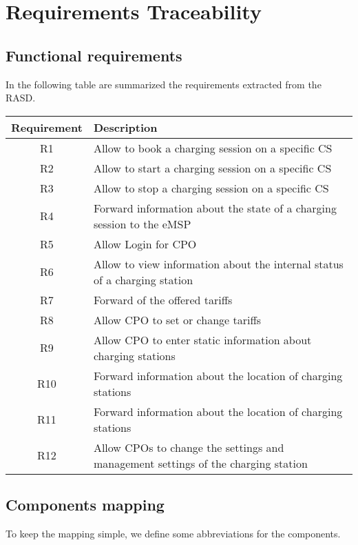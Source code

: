 \chapter{Requirements Traceability}
\section{Functional requirements}
In the following table are summarized the requirements extracted from the RASD.\\

\begin{tabular}{|c|l|}
	\hline
	\bf{Requirement} & \bf{Description} \\
	\hline
	R1 & Allow to book a charging session on a specific CS\\
	\hline
	R2 & Allow to start a charging session on a specific CS\\
	\hline
	R3 & Allow to stop a charging session on a specific CS\\
	\hline
	R4 & Forward information about the state of a charging session to the eMSP\\
	\hline
	R5 & Allow Login for CPO\\
	\hline
	R6 & Allow to view information about the internal status of a charging station\\
	\hline
	R7 & Forward of the offered tariffs\\
	\hline
	R8 & Allow CPO to set or change tariffs\\
	\hline
	R9 & Allow CPO to enter static information about charging stations\\
	\hline
	R10 & Forward information about the location of charging stations\\
	\hline
	R11 & Forward information about the location of charging stations\\
	\hline
	R12 & Allow CPOs to change the settings and management settings of the charging station\\
	\hline
\end{tabular}
\pagebreak
\section{Components mapping}
To keep the mapping simple, we define some abbreviations for the components.\\

